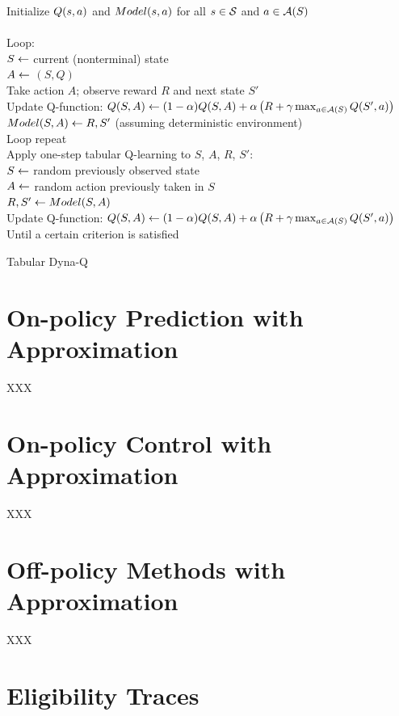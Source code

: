 \begin{table}
\beginalg
Initialize $Q(s,a)$ and $Model(s,a)$ for all $s\in\mathcal{S}$ and $a\in\mathcal{A}(S)$\\
\\
Loop:\\
\> $S \leftarrow$ current (nonterminal) state\\
\> $A \leftarrow$ \epsgreedy$(S,Q)$ \\
\> Take action $A$; observe reward $R$ and next state $S'$\\
\> Update Q-function: $Q(S,A) \leftarrow (1-\alpha) Q(S,A) + \alpha \left( R + \gamma \max_{a\in\mathcal{A}(S)}Q(S',a)\right)$\\
\> $Model(S,A) \leftarrow R, S'$ (assuming deterministic environment)\\
\> Loop repeat\\
\> Apply one-step tabular Q-learning to $S$, $A$, $R$, $S'$:\\
\> \> $S \leftarrow$ random previously observed state\\
\> \> $A \leftarrow$ random action previously taken in $S$\\
\> \> $R, S' \leftarrow Model(S,A)$\\
\> \> Update Q-function: $Q(S,A) \leftarrow (1-\alpha) Q(S,A) + \alpha \left( R + \gamma \max_{a\in\mathcal{A}(S)}Q(S',a) \right)$\\
Until a certain criterion is satisfied
\endalg
\caption{Tabular Dyna-Q}
\label{tab:alg:tabular-dyna-q}
\end{table}


\section{On-policy Prediction with Approximation}

XXX

\section{On-policy Control with Approximation}

XXX

\section{Off-policy Methods with Approximation}

XXX

\section{Eligibility Traces}



